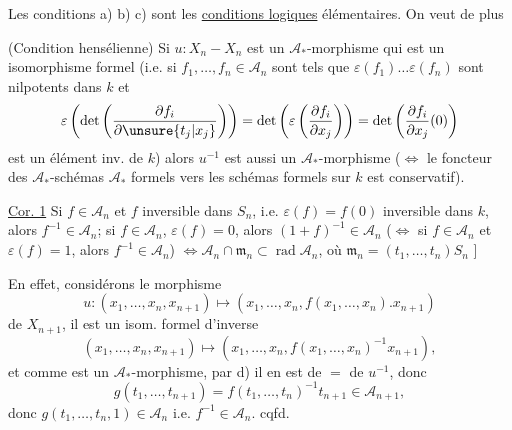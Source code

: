 Les conditions a) b) c) sont les \uline{conditions logiques} élémentaires. On veut de plus

 (Condition hensélienne) Si $u:X_n\mathbin{-}X_n$ est un $\mathcal A_*$-morphisme qui est un isomorphisme formel (i.e. si $f_1,\ldots,f_n\in \mathcal A_n$ sont tels que $\varepsilon(f_1)\ldots\varepsilon(f_n)$ sont nilpotents dans $k$ et
\[
\varepsilon\left(\det\left(\frac{\partial f_i}{\partial\unsure{t_j|x_j}}\right)\right)
=\det\left(\varepsilon\left(\frac{\partial f_i}{\partial x_j}\right)\right)
=\det\left(\frac{\partial f_i}{\partial x_j}(0)\right)
\]
est un élément inv. de $k$) alors $u^{-1}$ est aussi un $\mathcal A_*$-morphisme ($\Leftrightarrow$ le foncteur des $\mathcal A_*$-schémas $\mathcal A_*$ formels vers les schémas formels sur $k$ est conservatif).

\uline{Cor. 1} Si $f\in \mathcal A_n$ et $f$ inversible dans $S_n$, i.e. $\varepsilon(f)=f(0)$ inversible dans $k$, alors $f^{-1}\in \mathcal A_n$;  si $f\in \mathcal A_n$, $\varepsilon(f)=0$, alors $(1+f)^{-1}\in \mathcal A_n$ ($\Leftrightarrow$ si $f\in \mathcal A_n$ et $\varepsilon(f)=1$, alors $f^{-1}\in \mathcal A_n$) $\Leftrightarrow \mathcal A_n\cap\mathfrak m_n\subset\operatorname{rad}\mathcal A_n$, où  $\mathfrak m_n=(t_1,\ldots,t_n)S_n$ \unsure{\}|]} ]

En effet, considérons le  morphisme
\[
u:(x_1,\ldots,x_n,x_{n+1})\longmapsto
(x_1,\ldots,x_n,f(x_1,\ldots,x_n).x_{n+1})
\]
de $X_{n+1}$, il est un isom. formel d'inverse
\[
(x_1,\ldots,x_n,x_{n+1})\longmapsto
(x_1,\ldots,x_n,f(x_1,\ldots,x_n)^{-1}x_{n+1}),
\]
et comme   est un $\mathcal A_*$-morphisme, par d) il en est de $=$ de $u^{-1}$, donc
\[
g(t_1,\ldots,t_{n+1})=f(t_1,\ldots,t_n)^{-1}t_{n+1}\in \mathcal A_{n+1},
\]
 donc $g(t_1,\ldots,t_n,1)\in \mathcal A_n$ i.e. $f^{-1}\in \mathcal A_n$. cqfd.

